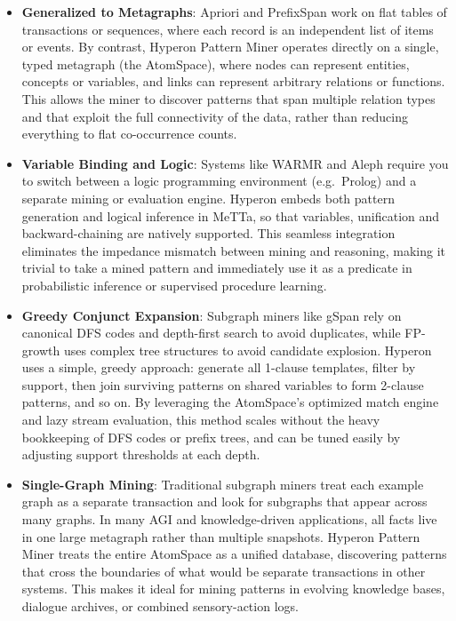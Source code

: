 \documentclass{article}
\begin{document}
\begin{itemize}
  \item \textbf{Generalized to Metagraphs}:  
    Apriori and PrefixSpan work on flat tables of transactions or sequences, where each record is an independent list of items or events.  By contrast, Hyperon Pattern Miner operates directly on a single, typed metagraph (the AtomSpace), where nodes can represent entities, concepts or variables, and links can represent arbitrary relations or functions.  This allows the miner to discover patterns that span multiple relation types and that exploit the full connectivity of the data, rather than reducing everything to flat co-occurrence counts.

  \item \textbf{Variable Binding and Logic}:  
    Systems like WARMR and Aleph require you to switch between a logic programming environment (e.g.\ Prolog) and a separate mining or evaluation engine.  Hyperon embeds both pattern generation and logical inference in MeTTa, so that variables, unification and backward-chaining are natively supported.  This seamless integration eliminates the impedance mismatch between mining and reasoning, making it trivial to take a mined pattern and immediately use it as a predicate in probabilistic inference or supervised procedure learning.

  \item \textbf{Greedy Conjunct Expansion}:  
    Subgraph miners like gSpan rely on canonical DFS codes and depth-first search to avoid duplicates, while FP-growth uses complex tree structures to avoid candidate explosion.  Hyperon uses a simple, greedy approach: generate all 1-clause templates, filter by support, then join surviving patterns on shared variables to form 2-clause patterns, and so on.  By leveraging the AtomSpace's optimized match engine and lazy stream evaluation, this method scales without the heavy bookkeeping of DFS codes or prefix trees, and can be tuned easily by adjusting support thresholds at each depth.

  \item \textbf{Single-Graph Mining}:  
    Traditional subgraph miners treat each example graph as a separate transaction and look for subgraphs that appear across many graphs.  In many AGI and knowledge-driven applications, all facts live in one large metagraph rather than multiple snapshots.  Hyperon Pattern Miner treats the entire AtomSpace as a unified database, discovering patterns that cross the boundaries of what would be separate transactions in other systems.  This makes it ideal for mining patterns in evolving knowledge bases, dialogue archives, or combined sensory-action logs.


\end{itemize}
\end{document}
